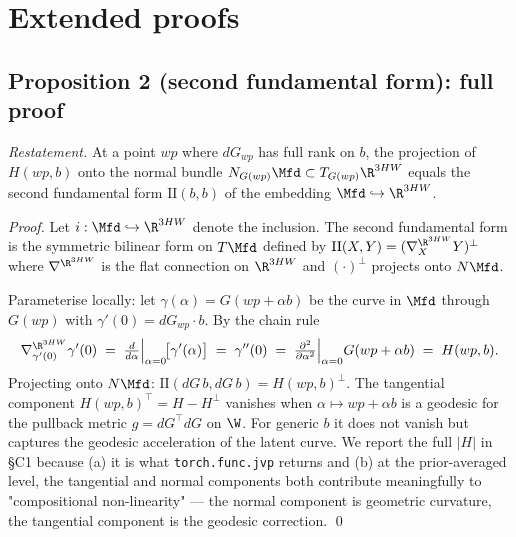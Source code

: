 %

\section{Extended proofs}
\label{app:proofs}

\subsection{Proposition 2 (second fundamental form): full proof}

\noindent\emph{Restatement.} At a point $wp$ where $dG_{wp}$ has full
rank on $b$, the projection of $H(wp, b)$ onto the normal bundle
$N_{G(wp)}\Mfd \subset T_{G(wp)}\R^{3HW}$ equals the second
fundamental form $\mathrm{II}(b, b)$ of the embedding
$\Mfd \hookrightarrow \R^{3HW}$.

\begin{proof}
Let $i:\Mfd \hookrightarrow \R^{3HW}$ denote the inclusion. The
second fundamental form is the symmetric bilinear form on $T\Mfd$
defined by
$\mathrm{II}(X, Y) = (\nabla^{\R^{3HW}}_X Y)^\perp$
where $\nabla^{\R^{3HW}}$ is the flat connection on $\R^{3HW}$ and
$(\cdot)^\perp$ projects onto $N\Mfd$.

Parameterise locally: let $\gamma(\alpha) = G(wp + \alpha b)$ be the
curve in $\Mfd$ through $G(wp)$ with $\gamma'(0) = dG_{wp}\cdot b$.
By the chain rule
$$\nabla^{\R^{3HW}}_{\gamma'(0)} \gamma'(0)
  \;=\; \tfrac{d}{d\alpha}\Big|_{\alpha = 0}
  \!\big[ \gamma'(\alpha) \big] \;=\; \gamma''(0)
  \;=\; \tfrac{\partial^2}{\partial \alpha^2}\Big|_{\alpha = 0}
  G(wp + \alpha b)
  \;=\; H(wp, b).$$
Projecting onto $N\Mfd$:
$\mathrm{II}(dG\,b, dG\,b) = H(wp, b)^\perp$.
The tangential component $H(wp, b)^\top = H - H^\perp$ vanishes when
$\alpha \mapsto wp + \alpha b$ is a geodesic for the pullback metric
$g = dG^\top dG$ on $\W$. For generic $b$ it does not vanish but
captures the geodesic acceleration of the latent curve. We report
the full $|H|$ in §C1 because (a) it is what \texttt{torch.func.jvp}
returns and (b) at the prior-averaged level, the tangential and
normal components both contribute meaningfully to "compositional
non-linearity" --- the normal component is geometric curvature, the
tangential component is the geodesic correction.
\qed
\end{proof}

